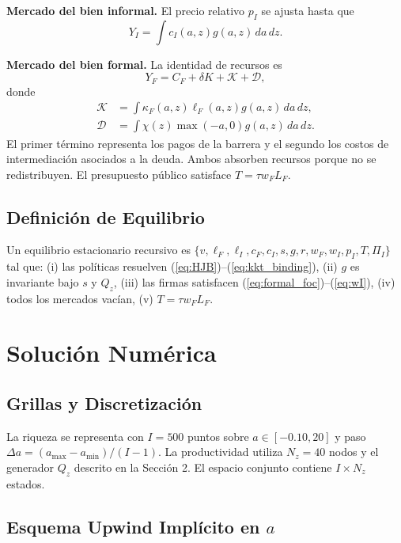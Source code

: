 \documentclass[12pt]{article}
\begin{document}
\textbf{Mercado del bien informal.} El precio relativo $p_I$ se ajusta hasta que
\begin{equation}
Y_I=\int c_I(a,z)g(a,z)\,da\,dz.
\end{equation}

\textbf{Mercado del bien formal.} La identidad de recursos es
\begin{equation}
Y_F=C_F+\delta K+\mathcal{K}+\mathcal{D},
\end{equation}
donde
\begin{align}
\mathcal K&=\int\kappa_F(a,z)\ell_F(a,z)g(a,z)\,da\,dz,\\
\mathcal D&=\int\chi(z)\max(-a,0)g(a,z)\,da\,dz.
\end{align}
El primer término representa los pagos de la barrera y el segundo los costos de intermediación asociados a la deuda. Ambos absorben recursos porque no se redistribuyen. El presupuesto público satisface $T=\tau w_FL_F$.

\subsection{Definición de Equilibrio}

Un equilibrio estacionario recursivo es $\{v, \ell_F, \ell_I, c_F, c_I, s, g, r, w_F, w_I, p_I, T, \Pi_I\}$ tal que: (i) las políticas resuelven (\ref{eq:HJB})--(\ref{eq:kkt_binding}), (ii) $g$ es invariante bajo $s$ y $Q_z$, (iii) las firmas satisfacen (\ref{eq:formal_foc})--(\ref{eq:wI}), (iv) todos los mercados vacían, (v) $T = \tau w_F L_F$.

\section{Solución Numérica}

\subsection{Grillas y Discretización}

La riqueza se representa con $I=500$ puntos sobre $a\in[-0.10,20]$ y paso $\Delta a=(a_{\max}-a_{\min})/(I-1)$. La productividad utiliza $N_z=40$ nodos y el generador $Q_z$ descrito en la Sección 2. El espacio conjunto contiene $I\times N_z$ estados.

\subsection{Esquema Upwind Implícito en $a$}
\end{document}
